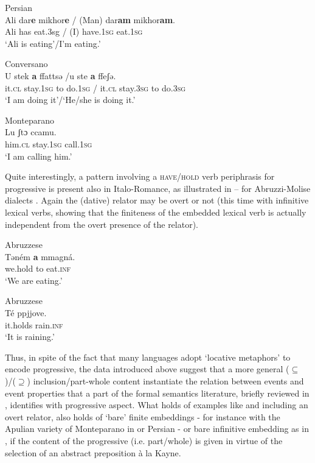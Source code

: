 \documentclass[output=paper,modfonts,nonflat,newtxmath,colorlinks,citecolor=brown]{langsci/langscibook}
\begin{document}
\ea Persian\\%
    \label{ex:franco:15}
    \gll Ali dar\textbf{e} mikhor\textbf{e} / (Man) dar\textbf{am} mikhor\textbf{am}. \\
        Ali has eat.3sg / (I) have.\textsc{1sg} eat.\textsc{1sg}\\
    \glt ‘Ali is eating’/I’m eating.’
    \z


\ea Conversano\\ %
    \label{ex:franco:16}
    \gll U stek   \textbf{a}   ffattsə /u   ste   \textbf{a}  ffeʃə.\\
        it.\textsc{cl}   stay.\textsc{1sg} to   do.\textsc{1sg} / it.\textsc{cl}   stay.\textsc{3sg}   to do.3\textsc{sg}\\
    \glt ‘I am doing it’/‘He/she is doing it.’
    \z
    
\ea Monteparano\\ %
    \label{ex:franco:17}
    \gll Lu   ʃtɔ   ccamu.  \\
        him.\textsc{cl} stay.\textsc{1sg}   call.\textsc{1sg} \\
    \glt ‘I am calling him.’
    \z

   

Quite interestingly, a pattern involving a \textsc{have/hold} verb periphrasis for progressive is present also in Italo-Romance, as illustrated in -- for Abruzzi-Molise dialects \citep[555]{Cinque2017}. Again the (dative) relator may be overt  or not  (this time with infinitive lexical verbs, showing that the finiteness of the embedded lexical verb is actually independent from the overt presence of the relator). 

\ea Abruzzese\\%
    \label{ex:franco:18}
    \gll Təném \textbf{a} mmagná.\\
        we.hold to eat.\textsc{inf}\\
    \glt ‘We are eating.’  \citep[133]{Rohlfs1969}

    \z

\ea Abruzzese\\%
    \label{ex:franco:19}
    \gll Té ppjjove.    \\
        it.holds rain.\textsc{inf}\\
    \glt ‘It is raining.’ \citep[266]{Ledgeway2016}
    \z

Thus, in spite of the fact that many languages adopt ‘locative metaphors’ to encode progressive, the data introduced above suggest that a more general (${\subseteq}$)/(${\supseteq}$) inclusion/part-whole content instantiate the relation between events and event properties that a part of the formal semantics literature, briefly reviewed in , identifies with progressive aspect.\textsuperscript{} What holds of examples like  and  including an overt relator, also holds of ‘bare’ finite embeddings - for instance with the Apulian variety of Monteparano in  or Persian  - or bare infinitive embedding as in , if the content of the progressive (i.e. part/whole) is given in virtue of the selection of an abstract preposition {à la} Kayne. 
\end{document}
